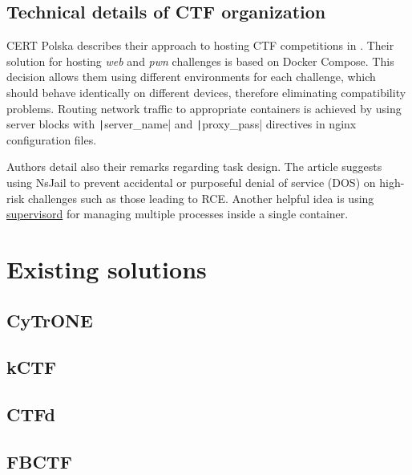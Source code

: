 \subsection{Technical details of CTF organization}

CERT Polska describes their approach to hosting CTF competitions in \cite{bib:hack.cert.pl}. Their solution for hosting \textit{web} and \textit{pwn} challenges is based on Docker Compose. This decision allows them using different environments for each challenge, which should behave identically on different devices, therefore eliminating compatibility problems. Routing network traffic to appropriate containers is achieved by using server blocks with \texttt|server_name| and \texttt|proxy_pass| directives in nginx configuration files.

Authors detail also their remarks regarding task design. The article suggests using NsJail to prevent accidental or purposeful denial of service (DOS) on high-risk challenges such as those leading to RCE. Another helpful idea is using \href{https://github.com/Supervisor/supervisor}{supervisord} for managing multiple processes inside a single container.

\section{Existing solutions}

\cite{bib:CTF-analysis}

\subsection{CyTrONE}

\cite{bib:cytrone}

\subsection{kCTF}

\subsection{CTFd}

\subsection{FBCTF}
